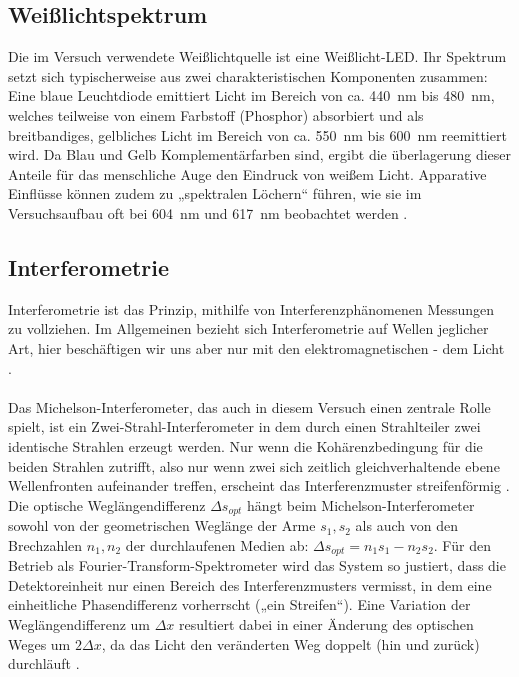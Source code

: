 \documentclass[10pt,a4paper]{article}
\begin{document}
\subsection{Weißlichtspektrum}

Die im Versuch verwendete Weißlichtquelle ist eine Weißlicht-LED. Ihr Spektrum setzt sich typischerweise aus zwei charakteristischen Komponenten zusammen: Eine blaue Leuchtdiode emittiert Licht im Bereich von ca. \qty{440}{nm} bis \qty{480}{nm}, welches teilweise von einem Farbstoff (Phosphor) absorbiert und als breitbandiges, gelbliches Licht im Bereich von ca. \qty{550}{nm} bis \qty{600}{nm} reemittiert wird. Da Blau und Gelb Komplementärfarben sind, ergibt die überlagerung dieser Anteile für das menschliche Auge den Eindruck von weißem Licht. Apparative Einflüsse können zudem zu „spektralen Löchern“ führen, wie sie im Versuchsaufbau oft bei \qty{604}{nm} und \qty{617}{nm} beobachtet werden \cite{5}.

\subsection{Interferometrie}
Interferometrie ist das Prinzip, mithilfe von Interferenzphänomenen Messungen zu vollziehen. Im Allgemeinen bezieht sich Interferometrie auf Wellen jeglicher Art, hier beschäftigen wir uns aber nur mit den elektromagnetischen - dem Licht \cite{1}.\\\\
Das Michelson-Interferometer, das auch in diesem Versuch einen zentrale Rolle spielt, ist ein Zwei-Strahl-Interferometer in dem durch einen Strahlteiler zwei identische Strahlen erzeugt werden. Nur wenn die Kohärenzbedingung für die beiden Strahlen zutrifft, also nur wenn zwei sich zeitlich gleichverhaltende ebene Wellenfronten aufeinander treffen, erscheint das Interferenzmuster streifenförmig \cite{2}.\\
Die optische Weglängendifferenz $\Delta s_{opt}$ hängt beim Michelson-Interferometer sowohl von der geometrischen Weglänge der Arme $s_1, s_2$ als auch von den Brechzahlen $n_1, n_2$ der durchlaufenen Medien ab: $\Delta s_{opt} = n_1s_1 - n_2s_2$. Für den Betrieb als Fourier-Transform-Spektrometer wird das System so justiert, dass die Detektoreinheit nur einen Bereich des Interferenzmusters vermisst, in dem eine einheitliche Phasendifferenz vorherrscht („ein Streifen“). Eine Variation der Weglängendifferenz um $\Delta x$ resultiert dabei in einer Änderung des optischen Weges um $2\Delta x$, da das Licht den veränderten Weg doppelt (hin und zurück) durchläuft \cite{1}.\\
\end{document}
